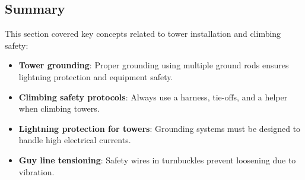 
\subsection*{Summary}
This section covered key concepts related to tower installation and climbing safety:
\begin{itemize}
    \item \textbf{Tower grounding}: Proper grounding using multiple ground rods ensures lightning protection and equipment safety.
    \item \textbf{Climbing safety protocols}: Always use a harness, tie-offs, and a helper when climbing towers.
    \item \textbf{Lightning protection for towers}: Grounding systems must be designed to handle high electrical currents.
    \item \textbf{Guy line tensioning}: Safety wires in turnbuckles prevent loosening due to vibration.
\end{itemize}
